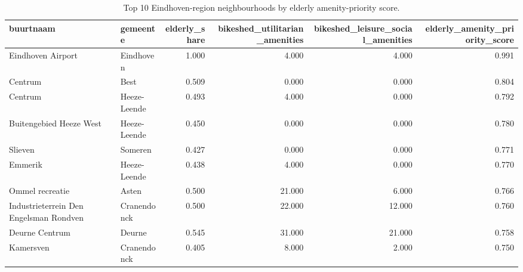 \begin{table}
\caption{Top 10 Eindhoven-region neighbourhoods by elderly amenity-priority score.}
\label{tab:top10_priority_neighbourhoods}
\begin{tabular}{llrrrr}
\toprule
buurtnaam & gemeente & elderly\_share & bikeshed\_utilitarian\_amenities & bikeshed\_leisure\_social\_amenities & elderly\_amenity\_priority\_score \\
\midrule
Eindhoven Airport & Eindhoven & 1.000 & 4.000 & 4.000 & 0.991 \\
Centrum & Best & 0.509 & 0.000 & 0.000 & 0.804 \\
Centrum & Heeze-Leende & 0.493 & 4.000 & 0.000 & 0.792 \\
Buitengebied Heeze West & Heeze-Leende & 0.450 & 0.000 & 0.000 & 0.780 \\
Slieven & Someren & 0.427 & 0.000 & 0.000 & 0.771 \\
Emmerik & Heeze-Leende & 0.438 & 4.000 & 0.000 & 0.770 \\
Ommel recreatie & Asten & 0.500 & 21.000 & 6.000 & 0.766 \\
Industrieterrein Den Engelsman Rondven & Cranendonck & 0.500 & 22.000 & 12.000 & 0.760 \\
Deurne Centrum & Deurne & 0.545 & 31.000 & 21.000 & 0.758 \\
Kamersven & Cranendonck & 0.405 & 8.000 & 2.000 & 0.750 \\
\bottomrule
\end{tabular}
\end{table}
